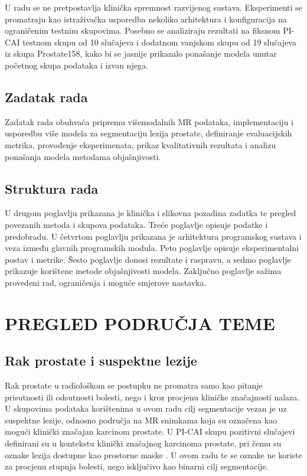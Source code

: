 \documentclass[a4paper,12pt,oneside]{article}
\let\sectionwithoutpagebreak\section
\renewcommand{\section}{\clearpage\sectionwithoutpagebreak}%
\begin{document}
U radu se ne pretpostavlja klinička spremnost razvijenog sustava. Eksperimenti se promatraju kao istraživačka usporedba nekoliko arhitektura i konfiguracija na ograničenim testnim skupovima. Posebno se analiziraju rezultati na fiksnom PI-CAI testnom skupu od 10 slučajeva i dodatnom vanjskom skupu od 19 slučajeva iz skupa Prostate158, kako bi se jasnije prikazalo ponašanje modela unutar početnog skupa podataka i izvan njega.

\subsection{Zadatak rada}


Zadatak rada obuhvaća pripremu višemodalnih MR podataka, implementaciju i usporedbu više modela za segmentaciju lezija prostate, definiranje evaluacijskih metrika, provođenje eksperimenata, prikaz kvalitativnih rezultata i analizu ponašanja modela metodama objašnjivosti.

\subsection{Struktura rada}

U drugom poglavlju prikazana je klinička i slikovna pozadina zadatka te pregled povezanih metoda i skupova podataka. Treće poglavlje opisuje podatke i predobradu. U četvrtom poglavlju prikazana je arhitektura programskog sustava i veza između glavnih programskih modula. Peto poglavlje opisuje eksperimentalni postav i metrike. Šesto poglavlje donosi rezultate i raspravu, a sedmo poglavlje prikazuje korištene metode objašnjivosti modela. Zaključno poglavlje sažima provedeni rad, ograničenja i moguće smjerove nastavka.

\section{PREGLED PODRUČJA TEME}

\subsection{Rak prostate i suspektne lezije}

Rak prostate u radiološkom se postupku ne promatra samo kao pitanje prisutnosti ili odsutnosti bolesti, nego i kroz procjenu kliničke značajnosti nalaza. U skupovima podataka korištenima u ovom radu cilj segmentacije vezan je uz suspektne lezije, odnosno područja na MR snimkama koja su označena kao mogući klinički značajan karcinom prostate. U PI-CAI skupu pozitivni slučajevi definirani su u kontekstu klinički značajnog karcinoma prostate, pri čemu su oznake lezija dostupne kao prostorne maske \cite{picai_dataset,picai_labels}. U ovom radu te se oznake ne koriste za procjenu stupnja bolesti, nego isključivo kao binarni cilj segmentacije.
\end{document}
